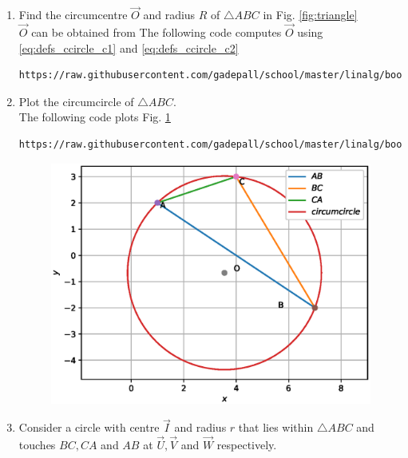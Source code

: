\renewcommand{\theequation}{\theenumi}
\begin{enumerate}[label=\arabic*.,ref=\thesubsection.\theenumi]

\item Find the circumcentre $\vec{O}$ and radius $R$ of $\triangle ABC$ in Fig. \ref{fig:triangle}
\\
\solution $\vec{O}$ can be obtained from 
%
The following code computes $\vec{O}$ using \eqref{eq:defs_ccircle_c1} and \eqref{eq:defs_ccircle_c2}
\begin{lstlisting}
https://raw.githubusercontent.com/gadepall/school/master/linalg/book/codes/circumcentre.py
\end{lstlisting}
\item Plot the circumcircle of $\triangle ABC$.
\\
\solution The following code plots Fig. \ref{fig:circumcircle}
\begin{lstlisting}
https://raw.githubusercontent.com/gadepall/school/master/linalg/book/codes/circumcircle.py
\end{lstlisting}
\begin{figure}
\centering
\includegraphics[width=\columnwidth]{./circle/figs/circumcircle.eps}
\caption{}
\label{fig:circumcircle}
\end{figure}


\item Consider a circle with centre $\vec{I}$ and radius $r$ that lies within $\triangle ABC$ and touches 
$BC, CA$ and $AB$ at $\vec{U}, \vec{V}$ and $\vec{W}$ respectively.


\end{enumerate}

